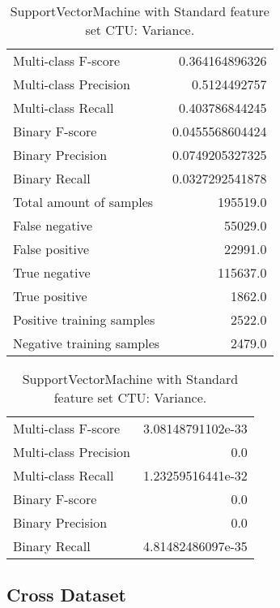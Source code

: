 \begin{table}[H]
\begin{minipage}{0.5\textwidth}
\caption{SupportVectorMachine with Standard feature set CTU: Average.}
\centering
\begin{tabular}{l r}
\toprule
Multi-class F-score & 0.364164896326 \\
Multi-class Precision & 0.5124492757 \\
Multi-class Recall & 0.403786844245 \\
\midrule
Binary F-score & 0.0455568604424 \\
Binary Precision & 0.0749205327325 \\
Binary Recall & 0.0327292541878 \\
\midrule
Total amount of samples & 195519.0 \\
False negative & 55029.0 \\
False positive & 22991.0 \\
True negative & 115637.0 \\
True positive & 1862.0 \\
\midrule
Positive training samples & 2522.0 \\
Negative training samples & 2479.0 \\
\bottomrule
\end{tabular}
\end{minipage}
\hfillx
\begin{minipage}{0.5\textwidth}
\caption{SupportVectorMachine with Standard feature set CTU: Variance.}
\centering
\begin{tabular}{l r}
\toprule
Multi-class F-score & 3.08148791102e-33 \\
Multi-class Precision & 0.0 \\
Multi-class Recall & 1.23259516441e-32 \\
\midrule
Binary F-score & 0.0 \\
Binary Precision & 0.0 \\
Binary Recall & 4.81482486097e-35 \\
\bottomrule
\end{tabular}
\end{minipage}
\end{table}

\newpage
\subsection{Cross Dataset}


